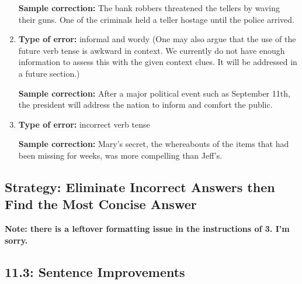\begin{enumerate}
\bigskip 
\textbf{Sample correction:} The bank robbers threatened the tellers by waving their guns. One of the criminals held a teller hostage until the police arrived. 

\bigskip
\item \textbf{Type of error:} informal and wordy (One may also argue that the use of the future verb tense is awkward in context. We currently do not have enough information to assess this with the given context clues. It will be addressed in a future section.)

\bigskip 
\textbf{Sample correction:} After a major political event such as September 11th, the president will address the nation to inform and comfort the public. 

\bigskip
\item \textbf{Type of error:} incorrect verb tense

\bigskip 
\textbf{Sample correction:} Mary's secret, the whereabouts of the items that had been missing for weeks, was more compelling than Jeff's. 

\end{enumerate}

\subsection{Strategy: Eliminate Incorrect Answers then Find the Most Concise Answer}

\textbf{Note: there is a leftover formatting issue in the instructions of 3. I'm sorry.}

\subsection{11.3: Sentence Improvements}

